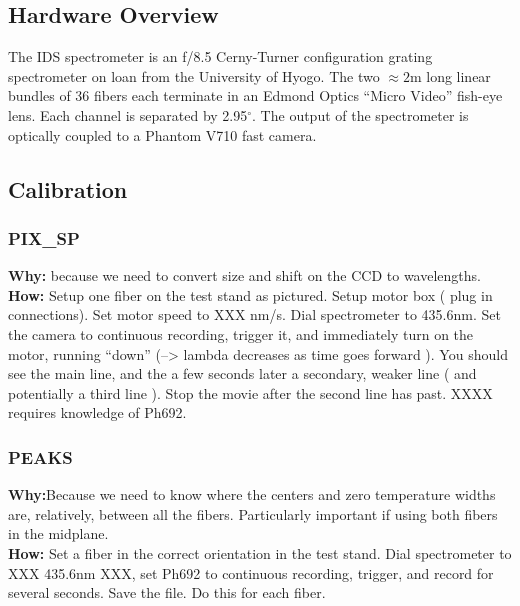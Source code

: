 \documentclass[twoside]{article}
\begin{document}
\subsection{Hardware Overview}
\hspace{4ex}The IDS spectrometer is an f/8.5 Cerny-Turner configuration grating spectrometer on loan from the University of Hyogo. The two $\approx2$m long linear bundles of 36 fibers each terminate in an Edmond Optics ``Micro Video'' fish-eye lens. Each channel is separated by 2.95$^\circ$. The output of the spectrometer is optically coupled to a Phantom V710 fast camera.
\subsection{Calibration}
\subsubsection{PIX\_SP}
\hspace{4ex}\textbf{Why:} because we need to convert size and shift on the CCD to wavelengths.\\
\hspace*{4ex}\textbf{How:} Setup one fiber on the test stand as pictured. Setup motor box ( plug in connections). Set motor speed to XXX nm/s. Dial spectrometer to 435.6nm. Set the camera to continuous recording, trigger it, and immediately turn on the motor, running “down” (--> lambda decreases as time goes forward ). You should see the main line, and the a few seconds later a secondary, weaker line ( and potentially a third line ). Stop the movie after the second line has past.  XXXX requires knowledge of Ph692.
\subsubsection{PEAKS}
\hspace{4ex}\textbf{Why:}Because we need to know where the centers and zero temperature widths are, relatively, between all the fibers. Particularly important if using both fibers in the midplane. \\
\hspace*{4ex}\textbf{How:} Set a fiber in the correct orientation in the test stand. Dial spectrometer to XXX 435.6nm XXX, set Ph692 to continuous recording, trigger, and record for several seconds. Save the file. Do this for each fiber.
\end{document}
